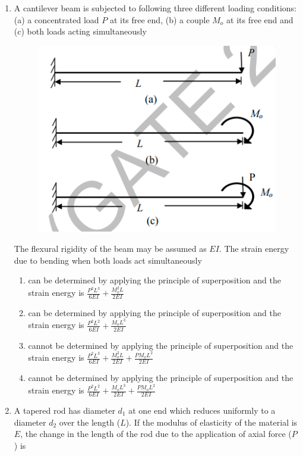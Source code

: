 \documentclass[a4paper,10pt]{article}
\begin{document}
\begin{enumerate}
    \item A cantilever beam is subjected to following three different loading conditions:
    (a) a concentrated load $P$ at its free end,
    (b) a couple $M_o$ at its free end and
    (c) both loads acting simultaneously
    \begin{figure}[H] \centering \includegraphics[width=0.4\columnwidth]{q15_solid.png} \caption*{} \label{fig:q15_solid} \end{figure}
    The flexural rigidity of the beam may be assumed as $EI$. The strain energy due to bending when both loads act simultaneously
    
    \hfill{}
    \begin{enumerate}
        \item can be determined by applying the principle of superposition and the strain energy is $\frac{P^2L^3}{6EI} + \frac{M_o^2 L}{2EI}$
        \item can be determined by applying the principle of superposition and the strain energy is $\frac{P^2L^2}{6EI} + \frac{M_o L^3}{2EI}$
        \item cannot be determined by applying the principle of superposition and the strain energy is $\frac{P^2L^3}{6EI} + \frac{M_o^2 L}{2EI} + \frac{P M_o L^2}{2EI}$
        \item cannot be determined by applying the principle of superposition and the strain energy is $\frac{P^2L^2}{6EI} + \frac{M_o L^3}{2EI} + \frac{P M_o L^2}{2EI}$
    \end{enumerate}
    
    \item A tapered rod has diameter $d_1$ at one end which reduces uniformly to a diameter $d_2$ over the length ($L$). If the modulus of elasticity of the material is $E$, the change in the length of the rod due to the application of axial force ($P$) is
    
    \hfill{}
    \begin{enumerate}
    \end{enumerate}
    

\end{enumerate}
\end{document}
